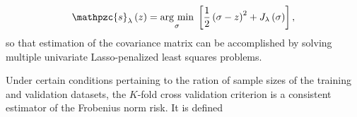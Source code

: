 \documentclass[12pt]{article}
\newcommand{\argmin}[1]{\underset{#1}{\operatorname{arg}\,\operatorname{min}}\;}
\theoremstyle{definition}
\begin{document}
\begin{equation} \label{eq:soft-thresholding-objective-function}
\mathpzc{s}_\lambda\left( z \right)  = \argmin{\sigma} \left[ \frac{1}{2} \left(\sigma - z\right)^2 + J_\lambda\left(\sigma \right)\right],
\end{equation}
\noindent
so that estimation of the covariance matrix can be accomplished by solving multiple univariate Lasso-penalized least squares problems. 
%

\bigskip

Under certain conditions pertaining to the ration of sample sizes of the training and validation datasets, the $K$-fold cross validation criterion is a consistent estimator of the Frobenius norm risk. It is defined 
\end{document}
